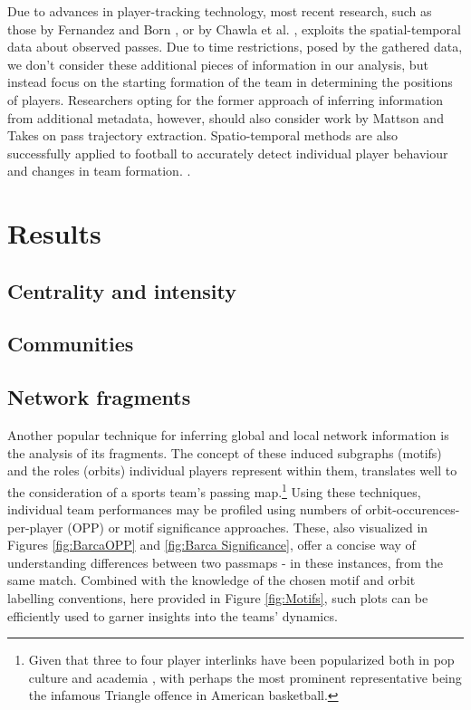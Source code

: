 \documentclass[9pt,twocolumn,twoside]{pnas-report}
\begin{document}
Due to advances in player-tracking technology, most recent research, such as those by Fernandez and Born \cite{fbrn}, or by Chawla et al. \cite{chawla}, exploits the spatial-temporal data about observed passes. Due to time restrictions, posed by the gathered data, we don't consider these additional pieces of information in our analysis, but instead focus on the starting formation of the team in determining the positions of players. Researchers opting for the former approach of inferring information from additional metadata, however, should also consider work by Mattson and Takes \cite{trajectory} on pass trajectory extraction. Spatio-temporal methods are also successfully applied to football to accurately detect individual player behaviour and changes in team formation. \cite{bialkowski2014large}.

\section*{Results}

\subsection*{Centrality and intensity}
\subsection*{Communities}
\subsection*{Network fragments}
Another popular technique for inferring global and local network information is the analysis of its fragments. The concept of these induced subgraphs (motifs) and the roles (orbits) individual players represent within them, translates well to the consideration of a sports team's passing map.\footnote{Given that three to four player interlinks have been popularized both in pop culture and academia \cite{triangle}, with perhaps the most prominent representative being the infamous Triangle offence in American basketball.}  Using these techniques, individual team performances may be profiled using numbers of orbit-occurences-per-player (OPP) or motif significance approaches. These, also visualized in Figures \ref{fig:BarcaOPP} and \ref{fig:Barca Significance}, offer a concise way of understanding differences between two passmaps - in these instances, from the same match. Combined with the knowledge of the chosen motif and orbit labelling conventions, here provided in Figure \ref{fig:Motifs}, such plots can be efficiently used to garner insights into the teams' dynamics. 
\end{document}
